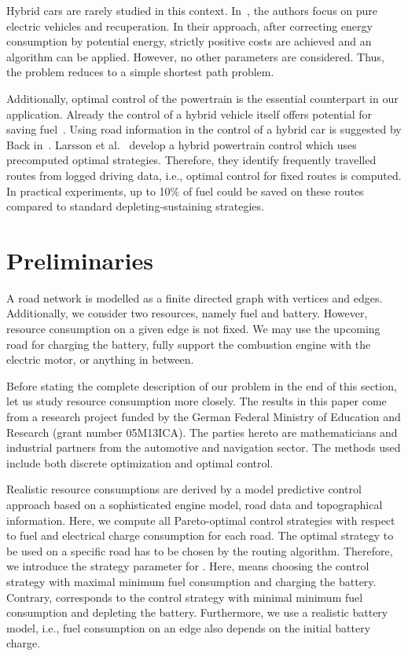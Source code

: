 \documentclass[a4paper]{scrartcl}
\begin{document}
Hybrid cars are rarely studied in this context. In~\cite{elektro:modellierung}, the authors focus on pure electric vehicles and recuperation. In their approach, after correcting energy consumption by potential energy, strictly positive costs are achieved and an  algorithm can be applied. However, no other parameters are considered. Thus, the problem reduces to a simple shortest path problem. 

Additionally, optimal control of the powertrain is the essential counterpart in our application. Already the control of a hybrid vehicle itself offers potential for saving fuel~\cite{hybrid:Zhang:motorsteuerung}. Using road information in the control of a hybrid car is suggested by Back in~\cite{back:motorsteuerung}. Larsson et al.~\cite{hybrid:Larsson:route+steuerung,hybrid:Larsson+:route+steuerung} develop a hybrid powertrain control which uses precomputed optimal strategies. Therefore, they identify frequently travelled routes from logged driving data, i.e., optimal control for fixed routes is computed. In practical experiments, up to 10\% of fuel could be saved on these routes compared to standard depleting-sustaining strategies.

\section{Preliminaries}\label{sec:preliminaries}

A road network is modelled as a finite directed graph  with  vertices and  edges. Additionally, we consider two resources, namely fuel and battery. However, resource consumption on a given edge is not fixed. We may use the upcoming road for charging the battery, fully support the combustion engine with the electric motor, or anything in between.

Before stating the complete description of our problem in the end of this section, let us study resource consumption more closely. The results in this paper come from a research project funded by the German Federal Ministry of Education and Research (grant number 05M13ICA). The parties hereto are mathematicians and industrial partners from the automotive and navigation sector. The methods used include both discrete optimization and optimal control.

Realistic resource consumptions are derived by a model predictive control approach based on a sophisticated engine model, road data and topographical information. Here, we compute all Pareto-optimal control strategies with respect to fuel and electrical charge consumption for each road. The optimal strategy to be used on a specific road has to be chosen by the routing algorithm. Therefore, we introduce the strategy parameter  for . Here,  means choosing the control strategy with maximal minimum fuel consumption and charging the battery. Contrary,  corresponds to the control strategy with minimal minimum fuel consumption and depleting the battery. Furthermore, we use a realistic battery model, i.e., fuel consumption on an edge also depends on the initial battery charge.
\end{document}
